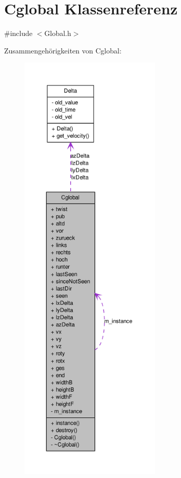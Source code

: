 \hypertarget{class_cglobal}{
\section{Cglobal Klassenreferenz}
\label{class_cglobal}
}


{\ttfamily \#include $<$Global.h$>$}



Zusammengehörigkeiten von Cglobal:\nopagebreak
\begin{figure}[H]
\begin{center}
\leavevmode
\includegraphics[height=600pt]{class_cglobal__coll__graph}
\end{center}
\end{figure}
